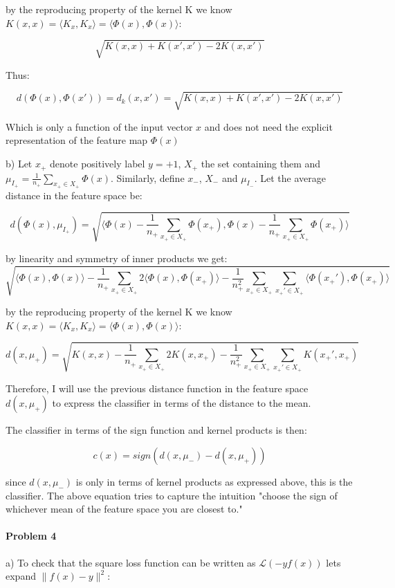 \documentclass[12pt]{report}
\begin{document}
by the reproducing property of the kernel K we know $K(x,x) = \langle K_x, K_x \rangle =\langle \Phi(x), \Phi(x) \rangle$:

$$\sqrt{ K(x,x) + K(x',x') - 2K(x,x')  }$$

Thus:

$$d(\Phi(x), \Phi(x')) =  d_{k}(x, x') = \sqrt{ K(x,x) + K(x',x') - 2K(x,x')  }$$

Which is only a function of the input vector $x$ and does not need the explicit representation of the feature map $\Phi(x)$

b) Let $x_+$ denote positively label $y = +1$, $X_+$ the set containing them and $ \mu_{I_+} =  \frac{1}{n_+}\sum_{x_+ \in X_+} \Phi(x) $. Similarly, define $x_-$, $X_-$ and $ \mu_{I_-}$. Let the average distance in the feature space be:

$$d(\Phi(x),  \mu_{I_+}) = \sqrt{ \langle \Phi(x) -  \frac{1}{n_+}\sum_{x_+ \in X_+}\Phi(x_+),   \Phi(x) - \frac{1}{n_+}\sum_{x_+  \in X_+}\Phi(x_+) \rangle }$$

by linearity and symmetry of inner products we get:
 $$\sqrt{ \langle \Phi(x), \Phi(x) \rangle - \frac{1}{n_+} \sum_{x_+ \in X_+} 2\langle \Phi(x), \Phi(x_+) \rangle - \frac{1}{n_+^2}\sum_{x_+ \in X_+} \sum_{x_+' \in X_+}  \langle  \Phi(x_+') , \Phi(x_+) \rangle       }$$
 
by the reproducing property of the kernel K we know $K(x,x) = \langle K_x, K_x \rangle =\langle \Phi(x), \Phi(x) \rangle$:
 
$$ d(x, \mu_+) = \sqrt{ K(x,x) - \frac{1}{n_+} \sum_{x_+ \in X_+} 2K(x, x_+) - \frac{1}{n_+^2} \sum_{x_+ \in X_+} \sum_{x_+' \in X_+}  K(x_+', x_+)       }$$

Therefore, I will use the previous distance function in the feature space $ d(x, \mu_+)$ to express the classifier in terms of the distance to the mean.

The classifier in terms of the sign function and kernel products is then:

$$c(x) = sign(d(x, \mu_-) - d(x, \mu_+))$$

since $d(x, \mu_-)$ is only in terms of kernel products as expressed above, this is the classifier. The above equation tries to capture the intuition "choose the sign of whichever mean of the feature space you are closest to."

\paragraph{Problem 4}
a) To check that the square loss function can be written as $\mathcal{L}(-yf(x))$ lets expand $\|f(x) - y\|^2$:
\end{document}
